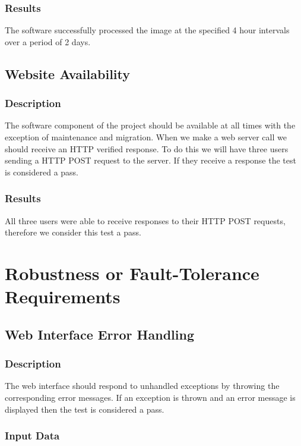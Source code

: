 \documentclass{scrreprt}
\begin{document}
\subsubsection{Results}

The software successfully processed the image at the specified 4 hour intervals
over a period of 2 days.

\subsection{Website Availability}
\subsubsection{Description}

The software component of the project should be available at all times with the
exception of maintenance and migration. When we make a web server call we should
receive an HTTP verified response. To do this we will have three users sending
a HTTP POST request to the server. If they receive a response the test is
considered a pass.

\subsubsection{Results}

All three users were able to receive responses to their HTTP POST requests,
therefore we consider this test a pass.

\section{Robustness or Fault-Tolerance Requirements}
\subsection{Web Interface Error Handling}
\subsubsection{Description}

The web interface should respond to unhandled exceptions by throwing the
corresponding error messages. If an exception is thrown and an error message is
displayed then the test is considered a pass.

\subsubsection{Input Data}
\end{document}
